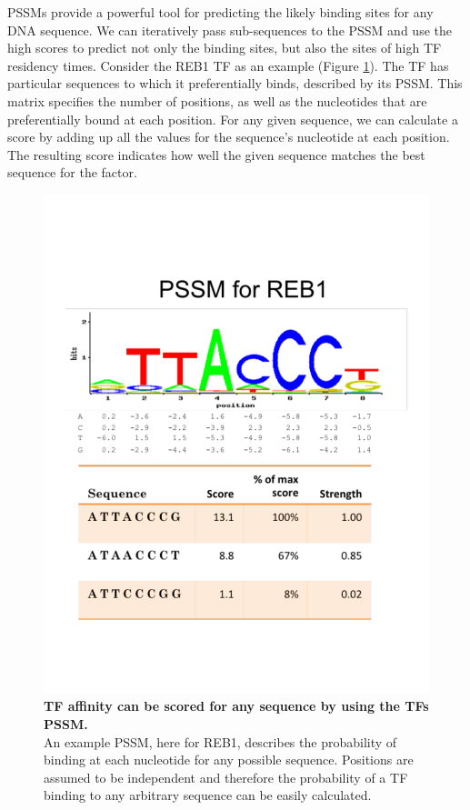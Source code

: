 \documentclass{article}
\newcommand{\tab}{\hspace{9mm}}
\begin{document}
\tab PSSMs provide a powerful tool for predicting the likely binding sites for any DNA sequence. We can iteratively pass sub-sequences to the PSSM and use the high scores to predict not only the binding sites, but also the sites of high TF residency times. Consider the REB1 TF as an example (Figure \ref{fig:example}). The TF has particular sequences to which it preferentially binds, described by its PSSM. This matrix specifies the number of positions, as well as the nucleotides that are preferentially bound at each position. For any given sequence, we can calculate a score by adding up all the values for the sequence’s nucleotide at each position. The resulting score indicates how well the given sequence matches the best sequence for the factor.

\begin{figure}[H]
  \centering
  \includegraphics[scale=0.29]{pssm_reb1.pdf}
  \caption{\textbf{TF affinity can be scored for any sequence by using the TFs PSSM.}\\An example PSSM, here for REB1, describes the probability of binding at each nucleotide for any possible sequence. Positions are assumed to be independent and therefore the probability of a TF binding to any arbitrary sequence can be easily calculated.}
  \label{fig:example}
\end{figure}
\end{document}
